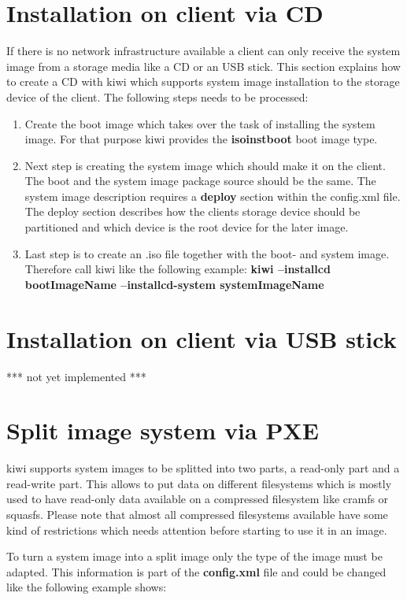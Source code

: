 \section{Installation on client via CD}
If there is no network infrastructure available a client can only receive
the system image from a storage media like a CD or an USB stick. This section
explains how to create a CD with kiwi which supports system image
installation to the storage device of the client. The following steps
needs to be processed:
\begin{enumerate}
\item Create the boot image which takes over the task of installing the
      system image. For that purpose kiwi provides the \textbf{isoinstboot}
      boot image type.
\item Next step is creating the system image which should make it on the
      client. The boot and the system image package source should be the same.
      The system image description requires a \textbf{deploy} section within
      the config.xml file. The deploy section describes how the clients
      storage device should be partitioned and which device is the root
      device for the later image.
\item Last step is to create an .iso file together with the boot- and
      system image. Therefore call kiwi like the following example:
	  \textbf{kiwi --installcd bootImageName --installcd-system systemImageName}
\end{enumerate}

\section{Installation on client via USB stick}
*** not yet implemented ***

\section{Split image system via PXE}
kiwi supports system images to be splitted into two parts, a read-only
part and a read-write part. This allows to put data on different
filesystems which is mostly used to have read-only data available on
a compressed filesystem like cramfs or squasfs. Please note that almost
all compressed filesystems available have some kind of restrictions
which needs attention before starting to use it in an image.
 
To turn a system image into a split image only the type of the image
must be adapted. This information is part of the \textbf{config.xml}
file and could be changed like the following example shows:

